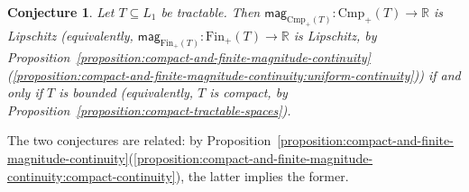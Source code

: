 \documentclass[11pt]{article}
\theoremstyle{plain}
\newtheorem{conjecture}[theorem]{Conjecture}
\theoremstyle{definition}
\newcommand{\RR}{\mathbb{R}}
\newcommand{\mg}[1][]{\mathsf{mag}_{#1}}
\newcommand{\fsub}{\mathrm{Fin}}
\newcommand{\ifsub}{\fsub_{+}}
\newcommand{\csub}{\mathrm{Cmp}}
\newcommand{\icsub}{\csub_{+}}
\begin{document}
\begin{conjecture}
Let $T \subseteq L_1$ be tractable. Then $\mg[\icsub(T)]\colon \icsub(T) \to \RR$ is Lipschitz (equivalently, $\mg[\ifsub(T)]\colon \ifsub(T) \to \RR$ is Lipschitz, by Proposition~\ref{proposition:compact-and-finite-magnitude-continuity}(\ref{proposition:compact-and-finite-magnitude-continuity:uniform-continuity})) if and only if $T$ is bounded (equivalently, $T$ is compact, by Proposition~\ref{proposition:compact-tractable-spaces}).
\end{conjecture}

The two conjectures are related: by Proposition~\ref{proposition:compact-and-finite-magnitude-continuity}(\ref{proposition:compact-and-finite-magnitude-continuity:compact-continuity}), the latter implies the former.






%
%
%
%
%
%

%
\end{document}
